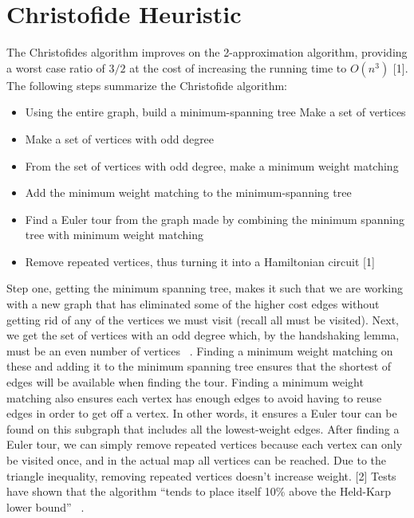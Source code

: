 \documentclass{article}
\begin{document}
\section{Christofide Heuristic}

The Christofides algorithm improves on the 2-approximation algorithm, providing
a worst case ratio of $3/2$ at the cost of increasing the running time to
$O(n^3)$ [1].\\

The following steps summarize the Christofide algorithm:
\begin{itemize}
  \item Using the entire graph, build a minimum-spanning tree Make a set of
        vertices
  \item Make a set of vertices with odd degree
  \item From the set of vertices with odd degree, make a minimum weight matching
  \item Add the minimum weight matching to the minimum-spanning tree
  \item Find a Euler tour from the graph made by combining the minimum spanning
        tree with minimum weight matching
  \item Remove repeated vertices, thus turning it into a Hamiltonian circuit [1]
\end{itemize}

Step one, getting the minimum spanning tree, makes it such that we are working
with a new graph that has eliminated some of the higher cost edges without
getting rid of any of the vertices we must visit (recall all must be visited).
Next, we get the set of vertices with an odd degree which, by the handshaking
lemma, must be an even number of vertices ~\cite{goodrich2015christofides}. Finding a minimum weight matching
on these and adding it to the minimum spanning tree ensures that the shortest
of edges will be available when finding the tour. Finding a minimum weight
matching also ensures each vertex has enough edges to avoid having to reuse
edges in order to get off a vertex. In other words, it ensures a Euler tour
can be found on this subgraph that includes all the lowest-weight edges. After
finding a Euler tour, we can simply remove repeated vertices because each vertex
can only be visited once, and in the actual map all vertices can be reached. Due
to the triangle inequality, removing repeated vertices doesn’t increase weight.
[2] Tests have shown that the algorithm “tends to place itself 10\% above the
Held-Karp lower bound” ~\cite{nilsson2003heuristics}.\\
\end{document}
